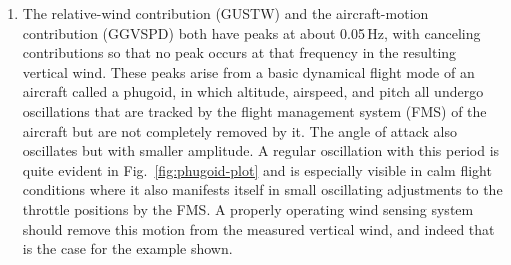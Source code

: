 \documentclass[12pt,twoside,english]{article}\usepackage[]{graphicx}\usepackage[]{color}
\newenvironment{knitrout}{}{} %
\let\OrgIndex\index
\renewcommand*{\index}[1]{\OrgIndex{#1}}
\begin{document}
{{\begin{enumerate}
\item The relative-wind contribution (GUSTW) and the aircraft-motion contribution (GGVSPD) both have peaks at about 0.05\,Hz, with canceling contributions so that no peak occurs at that frequency in the resulting vertical wind. These peaks arise from a basic dynamical flight mode of an aircraft called a phugoid, in which altitude, airspeed, and pitch all undergo oscillations that are tracked by the flight management system (FMS) of the aircraft  but are not completely removed by it. The angle of attack also oscillates but with smaller amplitude. A regular oscillation with this period is quite evident in Fig.~\ref{fig:phugoid-plot} and is especially visible in calm flight conditions where it also manifests itself in small oscillating adjustments to the throttle positions by the FMS. A properly operating wind sensing system should remove this motion from the measured vertical wind, and indeed that is the case for the example shown.

\begin{knitrout}\footnotesize
{}\color{fgcolor}\begin{figure}


\end{figure}
\end{knitrout}
\end{enumerate}}}
\end{document}

